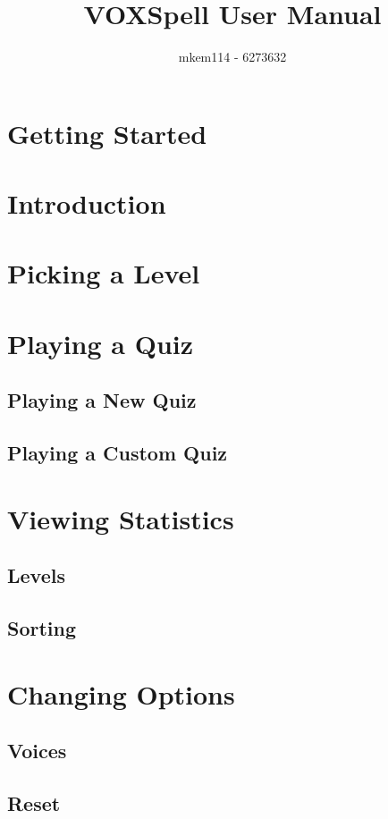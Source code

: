 \documentclass[12pt,a4paper,titlepage,onecolumn]{article}
\author{mkem114 - 6273632}
\title{VOXSpell User Manual}
\begin{document}
	\maketitle
	\tableofcontents
	\section{Getting Started}
	\section{Introduction}
	\section{Picking a Level}
	\section{Playing a Quiz}
		\subsection{Playing a New Quiz}
		\subsection{Playing a Custom Quiz}
	\section{Viewing Statistics}
		\subsection{Levels}
		\subsection{Sorting}
	\section{Changing Options}
		\subsection{Voices}
		\subsection{Reset}
		
\end{document}

